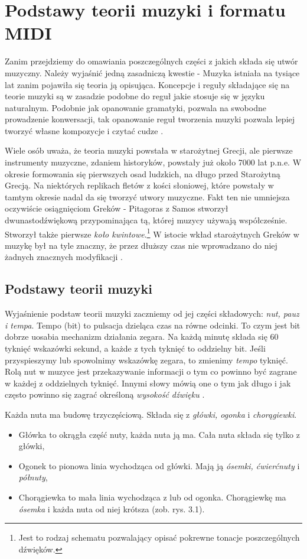 \chapter{Podstawy teorii muzyki i formatu MIDI} 
Zanim przejdziemy do omawiania poszczególnych części z jakich składa się utwór muzyczny. Należy wyjaśnić jedną zasadniczą kwestie - Muzyka istniała na tysiące lat zanim pojawiła się teoria ją opisująca.
Koncepcje i reguły składające się na teorie muzyki są w zasadzie podobne do reguł jakie stosuje się w języku naturalnym. Podobnie jak opanowanie gramatyki, pozwala na swobodne prowadzenie konwersacji, tak opanowanie reguł tworzenia muzyki pozwala lepiej tworzyć własne kompozycje i czytać cudze \citep[s. 22]{Pilhofer2018}.

Wiele osób uważa, że teoria muzyki powstała w starożytnej Grecji, ale pierwsze instrumenty muzyczne, zdaniem historyków, powstały już około 7000 lat p.n.e. W okresie formowania się pierwszych osad ludzkich, na długo przed Starożytną Grecją. Na niektórych replikach fletów z kości słoniowej, które powstały w tamtym okresie nadal da się tworzyć utwory muzyczne. Fakt ten nie umniejsza oczywiście osiągnięciom Greków - Pitagoras z Samos stworzył dwunastodźwiękową przypominająca tą, której muzycy używają współcześnie. Stworzył także pierwsze \textit{koło kwintowe}.\footnote{Jest to rodzaj schematu pozwalający opisać pokrewne tonacje poszczególnych dźwięków.} W istocie wkład starożytnych Greków w muzykę był na tyle znaczny, że przez dłuższy czas nie wprowadzano do niej żadnych znacznych modyfikacji \citep[s. 23]{Pilhofer2018}.

\section{Podstawy teorii muzyki} 
Wyjaśnienie podstaw teorii muzyki zaczniemy od jej części składowych: \textit{nut, pauz i tempa}.
Tempo (bit) to pulsacja dzieląca czas na równe odcinki. To czym jest bit dobrze uosabia mechanizm działania zegara. Na każdą minutę składa się 60 tyknięć wskazówki sekund, a każde z tych tyknięć to oddzielny bit. Jeśli przyspieszymy lub spowolnimy wskazówkę zegara, to zmienimy \textit{tempo} tyknięć. Rolą nut w muzyce jest przekazywanie informacji o tym co powinno być zagrane w każdej z oddzielnych tyknięć. Innymi słowy mówią one o tym jak długo i jak często powinno się zagrać określoną \textit{wysokość dźwięku} \citep[s. 31]{Pilhofer2018}.

Każda nuta ma budowę trzyczęściową. Składa się z \textit{główki, ogonka} i \textit{chorągiewki}.
\begin{itemize}
 \item Główka to okrągła część nuty, każda nuta ją ma. Cała nuta składa się tylko z główki,
 \item Ogonek to pionowa linia wychodząca od główki. Mają ją \textit{ósemki, ćwierćnuty} i \textit{półnuty},
 \item Chorągiewka to mała linia wychodząca z lub od ogonka. Chorągiewkę ma \textit{ósemka} i każda nuta od niej krótsza \citep[s. 32-33]{Pilhofer2018} (zob. rys. 3.1).
\end{itemize}

